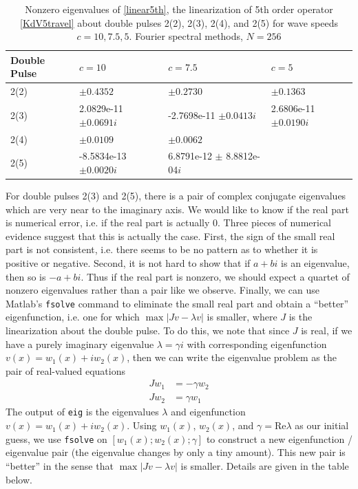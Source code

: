 \documentclass[12pt]{article}
\begin{document}
\begin{table}[H]
\begin{tabular}{l|lll}
 Double Pulse   & $c = 10$            & $c=7.5$                         & $c=5$        \\ \hline
  2(2) &     $\pm 0.4352$             & $\pm 0.2730$                    & $\pm 0.1363$ \\ 
  2(3) &     2.0829e-11 $\pm 0.0691i$ & -2.7698e-11 $\pm 0.0413i$       & 2.6806e-11 $\pm 0.0190i$\\ 
  2(4) &     $\pm 0.0109$             & $\pm 0.0062$                    & \\ 
  2(5) &    -8.5834e-13 $\pm 0.0020i$ & 6.8791e-12 $\pm$ 8.8812e-04$i$  & \\
\end{tabular}
\caption{Nonzero eigenvalues of \eqref{linear5th}, the linearization of 5th order operator \eqref{KdV5travel} about double pulses 2(2), 2(3), 2(4), and 2(5) for wave speeds $c = 10, 7.5, 5$. Fourier spectral methods, $N = 256$}
\end{table}

For double pulses 2(3) and 2(5), there is a pair of complex conjugate eigenvalues which are very near to the imaginary axis. We would like to know if the real part is numerical error, i.e. if the real part is actually 0. Three pieces of numerical evidence suggest that this is actually the case. First, the sign of the small real part is not consistent, i.e. there seems to be no pattern as to whether it is positive or negative. Second, it is not hard to show that if $a + bi$ is an eigenvalue, then so is $-a + bi$. Thus if the real part is nonzero, we should expect a quartet of nonzero eigenvalues rather than a pair like we observe. Finally, we can use Matlab's \texttt{fsolve} command to eliminate the small real part and obtain a ``better'' eigenfunction, i.e. one for which $\max{|Jv - \lambda v|}$ is smaller, where $J$ is the linearization about the double pulse. To do this, we note that since $J$ is real, if we have a purely imaginary eigenvalue $\lambda = \gamma i$ with corresponding eigenfunction $v(x) = w_1(x) + i w_2(x)$, then we can write the eigenvalue problem as the pair of real-valued equations
\begin{align}\label{simplesystem}
Jw_1 &= -\gamma w_2 \\
Jw_2 &= \gamma w_1
\end{align}
The output of \texttt{eig} is the eigenvalues $\lambda$ and eigenfunction $v(x) = w_1(x) + i w_2(x)$. Using $w_1(x)$, $w_2(x)$, and $\gamma = \textrm{Re} \lambda$ as our initial guess, we use \texttt{fsolve} on $[w_1(x); w_2(x); \gamma]$ to construct a new eigenfunction / eigenvalue pair (the eigenvalue changes by only a tiny amount). This new pair is ``better'' in the sense that $\max{|Jv - \lambda v|}$ is smaller. Details are given in the table below.
\end{document}
